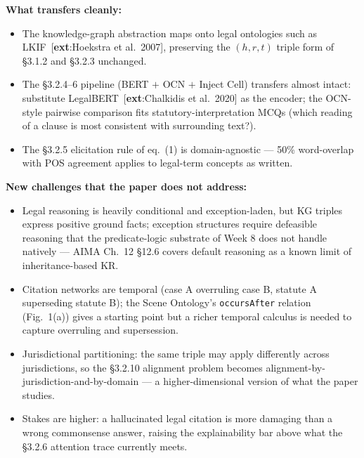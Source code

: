 \documentclass[11pt, a4paper]{article}
\newcommand{\extref}[1]{\textcolor{srcBd}{\small[\textbf{ext}:#1]}}
\begin{document}
\textbf{What transfers cleanly:}
\begin{itemize}
  \item The knowledge-graph abstraction maps onto legal ontologies such as LKIF~\extref{Hoekstra et al.\ 2007}, preserving the \((h, r, t)\) triple form of §3.1.2 and §3.2.3 unchanged.
  \item The §3.2.4--6 pipeline (BERT $+$ OCN $+$ Inject Cell) transfers almost intact: substitute LegalBERT~\extref{Chalkidis et al.\ 2020} as the encoder; the OCN-style pairwise comparison fits statutory-interpretation MCQs (which reading of a clause is most consistent with surrounding text?).
  \item The §3.2.5 elicitation rule of eq.\ (1) is domain-agnostic — 50\% word-overlap with POS agreement applies to legal-term concepts as written.
\end{itemize}

\textbf{New challenges that the paper does not address:}
\begin{itemize}
  \item Legal reasoning is heavily conditional and exception-laden, but KG triples express positive ground facts; exception structures require defeasible reasoning that the predicate-logic substrate of Week 8 does not handle natively — AIMA Ch.\ 12 §12.6 covers default reasoning as a known limit of inheritance-based KR.
  \item Citation networks are temporal (case A overruling case B, statute A superseding statute B); the Scene Ontology's \texttt{occursAfter} relation (Fig.\ 1(a)) gives a starting point but a richer temporal calculus is needed to capture overruling and supersession.
  \item Jurisdictional partitioning: the same triple may apply differently across jurisdictions, so the §3.2.10 alignment problem becomes alignment-by-jurisdiction-and-by-domain — a higher-dimensional version of what the paper studies.
  \item Stakes are higher: a hallucinated legal citation is more damaging than a wrong commonsense answer, raising the explainability bar above what the §3.2.6 attention trace currently meets.
\end{itemize}
\end{document}
